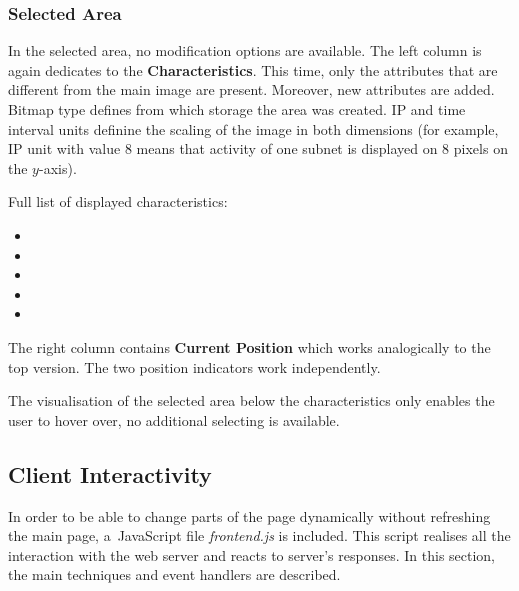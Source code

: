 \subsubsection{Selected Area}
In the selected area, no modification options are available.
The left column is again dedicates to the \textbf{Characteristics}. This time,
only the attributes that are different from the main image are present.
Moreover, new attributes are added. Bitmap type defines from which storage
the area was created. IP and time interval units definine
the scaling of the image in both dimensions (for example, IP unit with value
$8$ means that activity of one subnet is displayed on 8 pixels on the $y$-axis).

Full list of displayed characteristics:

\begin{itemize}
   \item {} 
   \item {} 
   \item {} 
   \item {} 
   \item {} 
\end{itemize}

The right column contains \textbf{Current Position} which works analogically
to the top version. The two position indicators work independently.

The visualisation of the selected area below the characteristics only enables
the user to hover over, no additional selecting is available. 

\subsection{Client Interactivity}
In order to be able to change parts of the page dynamically without 
refreshing the main page, a~JavaScript file \textit{frontend.js} is included.
This script realises all the interaction with the web server and reacts
to server's responses. In this section, the main techniques
and event handlers are described.

